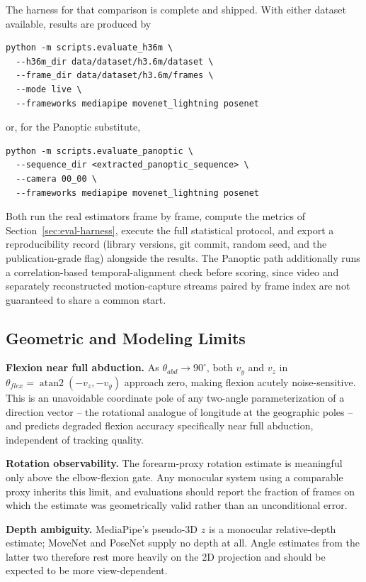 \documentclass[conference]{IEEEtran}
\begin{document}
The harness for that comparison is complete and shipped. With either
dataset available, results are produced by
\begin{verbatim}
python -m scripts.evaluate_h36m \
  --h36m_dir data/dataset/h3.6m/dataset \
  --frame_dir data/dataset/h3.6m/frames \
  --mode live \
  --frameworks mediapipe movenet_lightning posenet
\end{verbatim}
or, for the Panoptic substitute,
\begin{verbatim}
python -m scripts.evaluate_panoptic \
  --sequence_dir <extracted_panoptic_sequence> \
  --camera 00_00 \
  --frameworks mediapipe movenet_lightning posenet
\end{verbatim}
Both run the real estimators frame by frame, compute the metrics of
Section~\ref{sec:eval-harness}, execute the full statistical protocol,
and export a reproducibility record (library versions, git commit, random
seed, and the publication-grade flag) alongside the results. The Panoptic
path additionally runs a correlation-based temporal-alignment check
before scoring, since video and separately reconstructed motion-capture
streams paired by frame index are not guaranteed to share a common start.

\subsection{Geometric and Modeling Limits}
\textbf{Flexion near full abduction.} As $\theta_{abd}\to90^\circ$, both
$v_y$ and $v_z$ in $\theta_{flex}=\operatorname{atan2}(-v_z,-v_y)$
approach zero, making flexion acutely noise-sensitive. This is an
unavoidable coordinate pole of any two-angle parameterization of a
direction vector -- the rotational analogue of longitude at the
geographic poles -- and predicts degraded flexion accuracy specifically
near full abduction, independent of tracking quality.

\textbf{Rotation observability.} The forearm-proxy rotation estimate is
meaningful only above the elbow-flexion gate. Any monocular system using
a comparable proxy inherits this limit, and evaluations should report the
fraction of frames on which the estimate was geometrically valid rather
than an unconditional error.

\textbf{Depth ambiguity.} MediaPipe's pseudo-3D $z$ is a monocular
relative-depth estimate; MoveNet and PoseNet supply no depth at all.
Angle estimates from the latter two therefore rest more heavily on the 2D
projection and should be expected to be more view-dependent.
\end{document}
